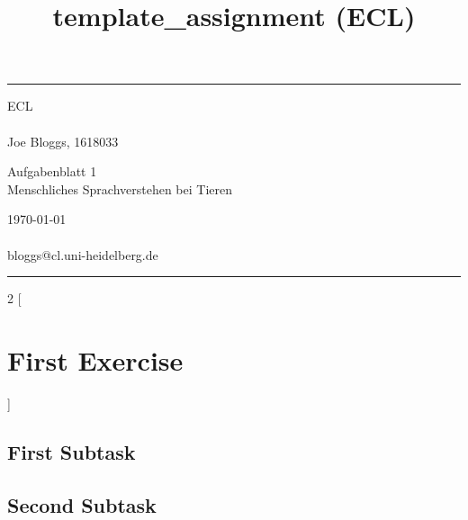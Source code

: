 \documentclass[a4paper]{article} %
\begin{document}

\title{template_assignment (ECL)} %
\fancyhead[C]{}
\hrule \medskip %
\begin{minipage}{0.295\textwidth} %
\raggedright
ECL\\ %
\footnotesize %
\hfill\\
Joe Bloggs, 1618033%
\end{minipage}
\begin{minipage}{0.4\textwidth} %
\centering 
\large %
Aufgabenblatt 1\\ %
\normalsize %
Menschliches Sprachverstehen bei Tieren\\ %
\end{minipage}
\begin{minipage}{0.295\textwidth} %
\raggedleft
\today\\ %
\footnotesize %
\hfill\\
bloggs@cl.uni-heidelberg.de %
\end{minipage}
\medskip\hrule %
\bigskip

\begin{multicols}{2}
[
\section{First Exercise}
\blindtext
]

\subsection{First Subtask}
\blindtext

\subsection{Second Subtask}
\blindtext


\end{multicols}
\end{document}
